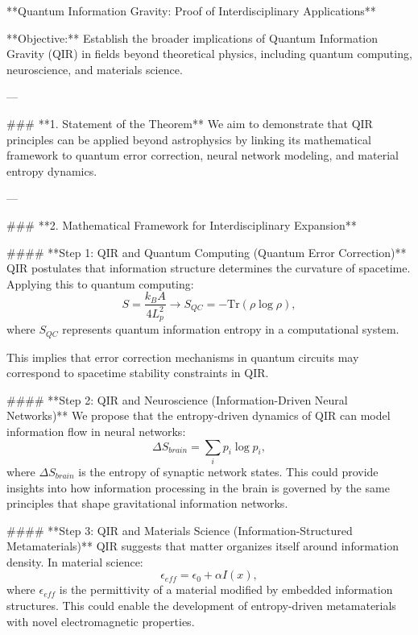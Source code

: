 **Quantum Information Gravity: Proof of Interdisciplinary Applications**

**Objective:** Establish the broader implications of Quantum Information Gravity (QIR) in fields beyond theoretical physics, including quantum computing, neuroscience, and materials science.

---

### **1. Statement of the Theorem**
We aim to demonstrate that QIR principles can be applied beyond astrophysics by linking its mathematical framework to quantum error correction, neural network modeling, and material entropy dynamics.

---

### **2. Mathematical Framework for Interdisciplinary Expansion**

#### **Step 1: QIR and Quantum Computing (Quantum Error Correction)**
QIR postulates that information structure determines the curvature of spacetime. Applying this to quantum computing:
\begin{equation}
    S = \frac{k_B A}{4 L_p^2} \rightarrow S_{QC} = -\text{Tr} ( \rho \log \rho ),
\end{equation}
where \( S_{QC} \) represents quantum information entropy in a computational system.

This implies that error correction mechanisms in quantum circuits may correspond to spacetime stability constraints in QIR.

#### **Step 2: QIR and Neuroscience (Information-Driven Neural Networks)**
We propose that the entropy-driven dynamics of QIR can model information flow in neural networks:
\begin{equation}
    \Delta S_{brain} = \sum_i p_i \log p_i,
\end{equation}
where \( \Delta S_{brain} \) is the entropy of synaptic network states. This could provide insights into how information processing in the brain is governed by the same principles that shape gravitational information networks.

#### **Step 3: QIR and Materials Science (Information-Structured Metamaterials)**
QIR suggests that matter organizes itself around information density. In material science:
\begin{equation}
    \epsilon_{eff} = \epsilon_0 + \alpha I(x),
\end{equation}
where \( \epsilon_{eff} \) is the permittivity of a material modified by embedded information structures. This could enable the development of entropy-driven metamaterials with novel electromagnetic properties.

